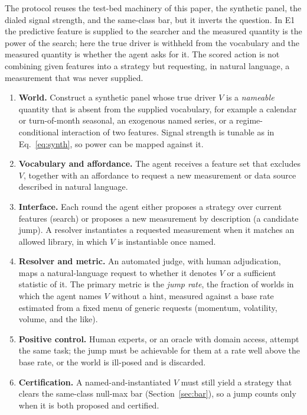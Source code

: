 \documentclass[11pt]{article}
\begin{document}
The protocol reuses the test-bed machinery of this paper, the synthetic panel, the dialed signal
strength, and the same-class bar, but it inverts the question. In E1 the predictive feature is supplied
to the searcher and the measured quantity is the power of the search; here the true driver is withheld
from the vocabulary and the measured quantity is whether the agent asks for it. The scored action is
not combining given features into a strategy but requesting, in natural language, a measurement that
was never supplied.

\begin{enumerate}[leftmargin=1.6em]
\item \textbf{World.} Construct a synthetic panel whose true driver $V$ is a \emph{nameable} quantity
that is absent from the supplied vocabulary, for example a calendar or turn-of-month seasonal, an
exogenous named series, or a regime-conditional interaction of two features. Signal strength is tunable
as in Eq.~\eqref{eq:synth}, so power can be mapped against it.
\item \textbf{Vocabulary and affordance.} The agent receives a feature set that excludes $V$, together
with an affordance to request a new measurement or data source described in natural language.
\item \textbf{Interface.} Each round the agent either proposes a strategy over current features (search)
or proposes a new measurement by description (a candidate jump). A resolver instantiates a requested
measurement when it matches an allowed library, in which $V$ is instantiable once named.
\item \textbf{Resolver and metric.} An automated judge, with human adjudication, maps a natural-language
request to whether it denotes $V$ or a sufficient statistic of it. The primary metric is the
\emph{jump rate}, the fraction of worlds in which the agent names $V$ without a hint, measured against a
base rate estimated from a fixed menu of generic requests (momentum, volatility, volume, and the like).
\item \textbf{Positive control.} Human experts, or an oracle with domain access, attempt the same task;
the jump must be achievable for them at a rate well above the base rate, or the world is ill-posed and
is discarded.
\item \textbf{Certification.} A named-and-instantiated $V$ must still yield a strategy that clears the
same-class null-max bar (Section~\ref{sec:bar}), so a jump counts only when it is both proposed and
certified.
\end{enumerate}
\end{document}
